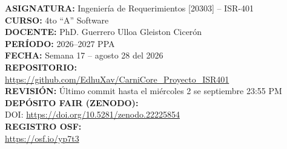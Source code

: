 \documentclass[11pt,a4paper]{article}
\begin{document}
\begin{titlepage}
    \textbf{ASIGNATURA:} Ingeniería de Requerimientos [20303] -- ISR-401\\[0.3cm]
    \textbf{CURSO:} 4to ``A'' Software\\[0.3cm]
    \textbf{DOCENTE:} PhD. Guerrero Ulloa Gleiston Cicerón\\[0.3cm]
    \textbf{PERÍODO:} 2026--2027 PPA\\[0.3cm]
    \textbf{FECHA:} Semana 17 -- agosto 28 del 2026\\[0.3cm]
    \textbf{REPOSITORIO:}\\[0.2cm]
    \url{https://github.com/EdhuXav/CarniCore_Proyecto_ISR401}\\[0.4cm]
    \textbf{REVISIÓN:} Último commit hasta el miércoles 2 se septiembre 23:55 PM\\[0.3cm]
    \textbf{DEPÓSITO FAIR (ZENODO):}\\[0.2cm]
    DOI: \url{https://doi.org/10.5281/zenodo.22225854}\\[0.2cm]
    \textbf{REGISTRO OSF:}\\[0.2cm]
    \url{https://osf.io/yp7t3}\\[0.4cm]
    \vfill
\end{titlepage}

\newpage
\end{document}
